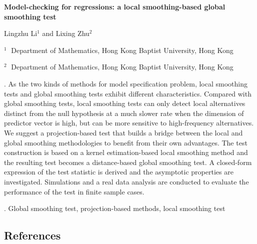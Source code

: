 \documentclass[12pt]{article}
\begin{document}
\begin{flushleft}


{\LARGE\bf Model-checking  for regressions: a local smoothing-based global smoothing test}


\vspace{1.0cm}

Lingzhu Li$^1$ and Lixing Zhu$^2$

\begin{description}

\item $^1 \;$ Department of Mathematics, Hong Kong Baptist University, Hong Kong

\item $^2 \;$ Department of Mathematics, Hong Kong Baptist University, Hong Kong

\end{description}

\end{flushleft}


\vspace{0.75cm}

. As the two kinds of methods for  model specification problem, local smoothing tests and global smoothing tests exhibit different characteristics.
Compared with global smoothing tests, local smoothing tests can only detect local alternatives distinct from the null hypothesis at a much   slower rate when the dimension of predictor vector is high, but can be more sensitive to high-frequency alternatives.
We suggest a projection-based test that builds a bridge between the local and global smoothing methodologies to benefit from their own advantages.
The test construction is based on a kernel estimation-based local smoothing method and the resulting test becomes a distance-based global smoothing test.
A closed-form expression of the test statistic is derived and the asymptotic properties are investigated.
Simulations and a real data analysis are conducted to evaluate the performance of the test in finite sample cases.

\vskip 2mm

. Global smoothing test, projection-based methods, local smoothing test


\subsection*{References}
\end{document}
